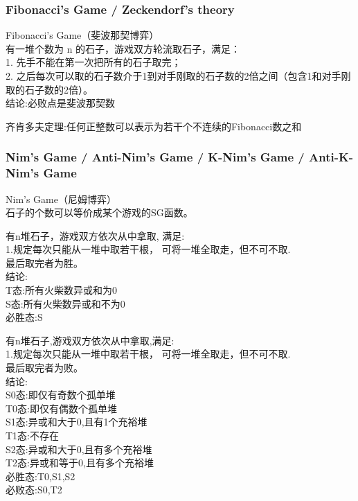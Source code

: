 \documentclass[10pt]{ctexart}
\begin{document}
{{\subsubsection{Fibonacci’s Game / Zeckendorf's theory}
Fibonacci’s Game（斐波那契博弈）\\
有一堆个数为 n 的石子，游戏双方轮流取石子，满足：\\
1. 先手不能在第一次把所有的石子取完；\\
2. 之后每次可以取的石子数介于1到对手刚取的石子数的2倍之间（包含1和对手刚取的石子数的2倍）。\\
结论:必败点是斐波那契数\\
\par
齐肯多夫定理:任何正整数可以表示为若干个不连续的Fibonacci数之和\\
\subsubsection{Nim’s Game / Anti-Nim's Game / K-Nim's Game / Anti-K-Nim's Game}
Nim’s Game（尼姆博弈）\\
石子的个数可以等价成某个游戏的SG函数。\\
\par
有n堆石子，游戏双方依次从中拿取, 满足:\\
1.规定每次只能从一堆中取若干根， 可将一堆全取走，但不可不取.\\
最后取完者为胜。\\
结论:\\
T态:所有火柴数异或和为0\\
S态:所有火柴数异或和不为0\\
必胜态:S\\
\par
有n堆石子,游戏双方依次从中拿取,满足:\\
1.规定每次只能从一堆中取若干根， 可将一堆全取走，但不可不取.\\
最后取完者为败。\\
结论:\\
S0态:即仅有奇数个孤单堆\\
T0态:即仅有偶数个孤单堆\\
S1态:异或和大于0,且有1个充裕堆\\
T1态:不存在\\
S2态:异或和大于0,且有多个充裕堆\\
T2态:异或和等于0,且有多个充裕堆\\
必胜态:T0,S1,S2\\
必败态:S0,T2\\
\par
}}
\end{document}
